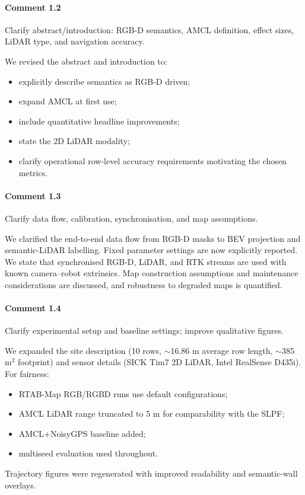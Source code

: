 \documentclass[a4paper]{article}
\def\answer#1#2{
  \begin{tcolorbox}[width=\textwidth,colback={white},title={\textbf{Answer
    #1}},colbacktitle=answerBoxColor,coltitle=white] #2
\end{tcolorbox} }
\begin{document}
\paragraph{Comment 1.2}
{\color{commentColor}
  Clarify abstract/introduction: RGB-D semantics, AMCL definition, effect sizes, LiDAR type, and navigation accuracy.
}
\answer{1.2}{
  We revised the abstract and introduction to:
  \begin{itemize}
    \item explicitly describe semantics as RGB-D driven;
    \item expand AMCL at first use;
    \item include quantitative headline improvements;
    \item state the 2D LiDAR modality;
    \item clarify operational row-level accuracy requirements motivating the chosen metrics.
  \end{itemize}
}

\paragraph{Comment 1.3}
{\color{commentColor}
  Clarify data flow, calibration, synchronisation, and map assumptions.
}
\answer{1.3}{
  We clarified the end-to-end data flow from RGB-D masks to BEV projection and semantic-LiDAR labelling.
  Fixed parameter settings are now explicitly reported.
  We state that synchronised RGB-D, LiDAR, and RTK streams are used with known camera–robot extrinsics.
  Map construction assumptions and maintenance considerations are discussed, and robustness to degraded maps is quantified.
}

\paragraph{Comment 1.4}
{\color{commentColor}
  Clarify experimental setup and baseline settings; improve qualitative figures.
}
\answer{1.4}{
  We expanded the site description (10 rows, $\sim$16.86 m average row length, $\sim$385 m$^2$ footprint) and sensor details (SICK Tim7 2D LiDAR, Intel RealSense D435i).
  For fairness:
  \begin{itemize}
    \item RTAB-Map RGB/RGBD runs use default configurations;
    \item AMCL LiDAR range truncated to 5 m for comparability with the SLPF;
    \item AMCL+NoisyGPS baseline added;
    \item multiseed evaluation used throughout.
  \end{itemize}
  Trajectory figures were regenerated with improved readability and semantic-wall overlays.
}
\end{document}
